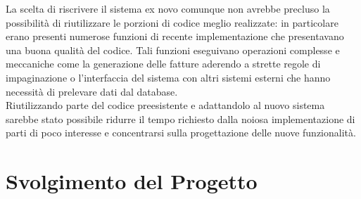 La scelta di riscrivere il sistema ex novo comunque non avrebbe precluso la possibilit\`a di riutilizzare le porzioni di codice meglio realizzate: in particolare erano presenti numerose funzioni di recente implementazione che presentavano una buona qualit\`a del codice. Tali funzioni eseguivano operazioni complesse e meccaniche come la generazione delle fatture aderendo a strette regole di impaginazione o l'interfaccia del sistema con altri sistemi esterni che hanno necessit\`a di prelevare dati dal database. \\
Riutilizzando parte del codice preesistente e adattandolo al nuovo sistema sarebbe stato possibile  ridurre il tempo richiesto dalla noiosa implementazione di parti di poco interesse  e concentrarsi sulla progettazione delle nuove funzionalit\`a.

\chapter{Svolgimento del Progetto}

